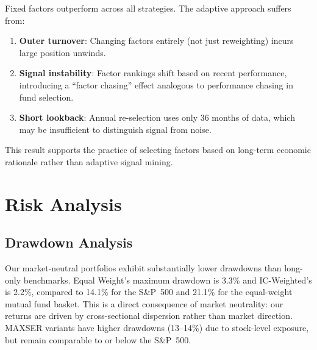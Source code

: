 \documentclass[12pt,a4paper]{article}
\begin{document}
\begin{table}[H]
\centering
\caption{Adaptive vs Fixed Factor Selection}
\label{tab:adaptive}
\end{table}

Fixed factors outperform across all strategies. The adaptive approach suffers from:
\begin{enumerate}[noitemsep]
    \item \textbf{Outer turnover}: Changing factors entirely (not just reweighting) incurs large position unwinds.
    \item \textbf{Signal instability}: Factor rankings shift based on recent performance, introducing a ``factor chasing'' effect analogous to performance chasing in fund selection.
    \item \textbf{Short lookback}: Annual re-selection uses only 36 months of data, which may be insufficient to distinguish signal from noise.
\end{enumerate}

This result supports the practice of selecting factors based on long-term economic rationale rather than adaptive signal mining.

\section{Risk Analysis}
\label{sec:risk}

\subsection{Drawdown Analysis}

Our market-neutral portfolios exhibit substantially lower drawdowns than long-only benchmarks. Equal Weight's maximum drawdown is 3.3\% and IC-Weighted's is 2.2\%, compared to 14.1\% for the S\&P~500 and 21.1\% for the equal-weight mutual fund basket. This is a direct consequence of market neutrality: our returns are driven by cross-sectional dispersion rather than market direction. MAXSER variants have higher drawdowns (13--14\%) due to stock-level exposure, but remain comparable to or below the S\&P~500.
\end{document}

